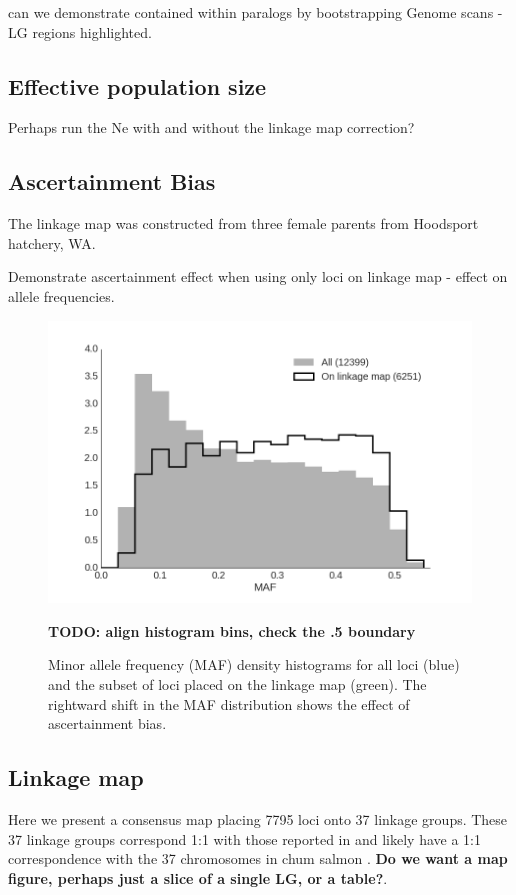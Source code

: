 \documentclass[12pt, one column]{article}
\begin{document}
can we demonstrate contained within paralogs by bootstrapping 
Genome scans - LG regions highlighted.

\subsection*{Effective population size}


Perhaps run the Ne with and without the linkage map correction?

\subsection*{Ascertainment Bias}
The linkage map was constructed from three female parents from Hoodsport hatchery, WA.

Demonstrate ascertainment effect when using only loci on linkage map - effect on allele frequencies.

\begin{figure}[H]
\includegraphics[scale=.3]{figures/supplemental/ascertainment.png}
\caption{Minor allele frequency (MAF) density histograms for all loci (blue) and the subset of loci placed on the linkage map (green). The rightward shift in the MAF distribution shows the effect of ascertainment bias.} \textbf{TODO: align histogram bins, check the .5 boundary}
\end{figure}

\subsection*{Linkage map}
Here we present a consensus map placing 7795 loci onto 37 linkage groups.  These 37 linkage groups correspond 1:1 with those reported in \citep{Waples2015} and likely have a 1:1 correspondence with the 37 chromosomes in chum salmon \citep{Phillips2001}. \textbf{Do we want a map figure, perhaps just a slice of a single LG, or a table?}.
\end{document}
